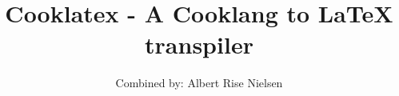   \title{Cooklatex - A Cooklang to LaTeX transpiler}
\author{Combined by: Albert Rise Nielsen}

\maketitle
